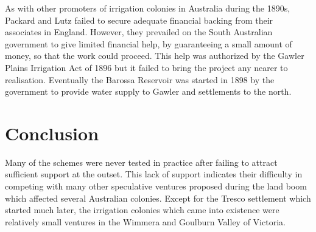 As with other promoters of irrigation colonies in Australia during the
1890s, Packard and Lutz failed to secure adequate financial backing
from their associates in England.  However, they prevailed on the
South Australian government to give limited financial help, by
guaranteeing a small amount of money, so that the work could proceed.
This help was authorized by the Gawler Plains Irrigation Act of 1896
but it failed to bring the project any nearer to realisation.
Eventually the Barossa Reservoir was started in 1898 by the government
to provide water supply to Gawler and settlements to the north.

\section*{Conclusion}

Many of the schemes were never tested in practice after failing to
attract sufficient support at the outset. This lack of support
indicates their difficulty in competing with many other speculative
ventures proposed during the land boom which affected several
Australian colonies. Except for the Tresco settlement which started
much later, the irrigation colonies which came into existence were
relatively small ventures in the Wimmera and Goulburn Valley of
Victoria.

